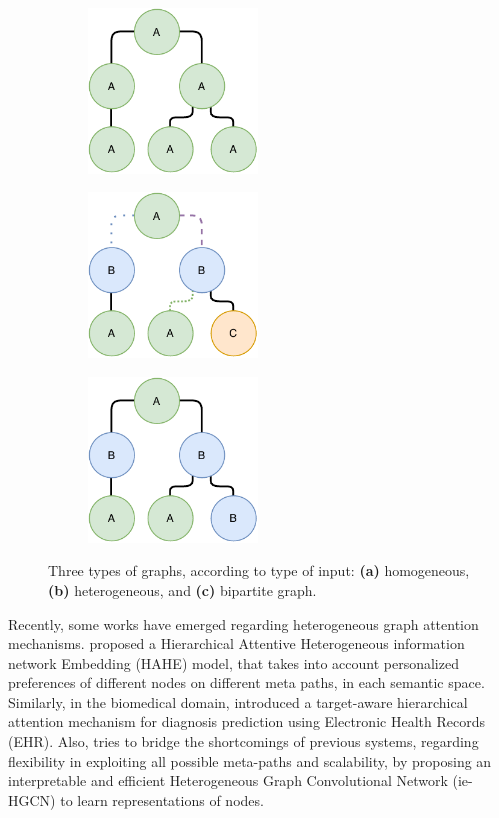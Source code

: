 \begin{figure}
\captionsetup{font=small}
\centering
\begin{subfigure}[b]{0.3\textwidth}
    \includegraphics[width=4.5cm]{images/graph_a.pdf}
    \caption{}
    \label{figure:a}
  \end{subfigure}
  \begin{subfigure}[b]{0.3\textwidth}
    \includegraphics[width=4.5cm]{images/graph_b.pdf}
    \caption{}
    \label{figure:b}
  \end{subfigure}
  \begin{subfigure}[b]{0.3\textwidth}
    \includegraphics[width=4.5cm]{images/graph_c.pdf}
    \caption{}
    \label{figure:c}
  \end{subfigure}
\fontsize{9}{10.8}\caption[Types of Graphs According to Input]{Three types of graphs, according to type of input: \textbf{(a)} homogeneous, \textbf{(b)} heterogeneous, and \textbf{(c)} bipartite graph.}
\label{figure:graphs}
\end{figure}

Recently, some works have emerged regarding heterogeneous graph attention mechanisms. \cite{zhou2019hahe} proposed a Hierarchical Attentive Heterogeneous information network Embedding (HAHE) model, that takes into account personalized preferences of different nodes on different meta paths, in each semantic space. Similarly, in the biomedical domain, \cite{hosseini2019hierarchical} introduced a target-aware hierarchical attention mechanism for diagnosis prediction using Electronic Health Records (EHR). Also, \cite{yang2020interpretable} tries to bridge the shortcomings of previous systems, regarding flexibility in exploiting all possible meta-paths and scalability, by proposing an interpretable and efficient Heterogeneous Graph Convolutional Network (ie-HGCN) to learn representations of nodes. 

